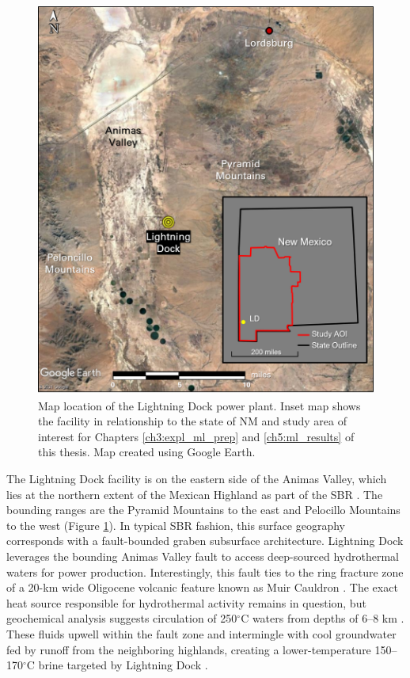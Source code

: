 \begin{figure}%
\centering
\includegraphics[width=.85\textwidth]{templates/images/Figure-Lightning_Dock_Location_composite.png}
\caption[Lightning Dock power plant location map]{Map location of the Lightning Dock power plant. Inset map shows the facility in relationship to the state of NM and study area of interest for Chapters \ref{ch3:expl_ml_prep} and \ref{ch5:ml_results} of this thesis. Map created using Google Earth.}
\label{fig:lightning_dock_map}
\end{figure}

The Lightning Dock facility is on the eastern side of the Animas Valley, which lies at the northern extent of the Mexican Highland as part of the SBR \citep{cunniff_final_2005}. The bounding ranges are the Pyramid Mountains to the east and Pelocillo Mountains to the west (Figure \ref{fig:lightning_dock_map}). In typical SBR fashion, this surface geography corresponds with a fault-bounded graben subsurface architecture. Lightning Dock leverages the bounding Animas Valley fault to access deep-sourced hydrothermal waters for power production. Interestingly, this fault ties to the ring fracture zone of a 20-km wide Oligocene volcanic feature known as Muir Cauldron \citep{elston_geology_1983}. The exact heat source responsible for hydrothermal activity remains in question, but geochemical analysis suggests circulation of 250$^\circ$C waters from depths of 6--8 km \citep{schochet_development_2001}. These fluids upwell within the fault zone and intermingle with cool groundwater fed by runoff from the neighboring highlands, creating a lower-temperature 150--170$^\circ$C brine targeted by Lightning Dock \citep{crowell_history_2014}.

